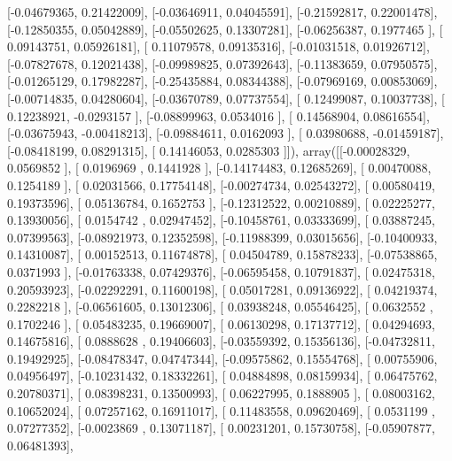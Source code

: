 \documentclass{article}
\begin{document}
       [-0.04679365,  0.21422009],
       [-0.03646911,  0.04045591],
       [-0.21592817,  0.22001478],
       [-0.12850355,  0.05042889],
       [-0.05502625,  0.13307281],
       [-0.06256387,  0.1977465 ],
       [ 0.09143751,  0.05926181],
       [ 0.11079578,  0.09135316],
       [-0.01031518,  0.01926712],
       [-0.07827678,  0.12021438],
       [-0.09989825,  0.07392643],
       [-0.11383659,  0.07950575],
       [-0.01265129,  0.17982287],
       [-0.25435884,  0.08344388],
       [-0.07969169,  0.00853069],
       [-0.00714835,  0.04280604],
       [-0.03670789,  0.07737554],
       [ 0.12499087,  0.10037738],
       [ 0.12238921, -0.0293157 ],
       [-0.08899963,  0.0534016 ],
       [ 0.14568904,  0.08616554],
       [-0.03675943, -0.00418213],
       [-0.09884611,  0.0162093 ],
       [ 0.03980688, -0.01459187],
       [-0.08418199,  0.08291315],
       [ 0.14146053,  0.0285303 ]]), array([[-0.00028329,  0.0569852 ],
       [ 0.0196969 ,  0.1441928 ],
       [-0.14174483,  0.12685269],
       [ 0.00470088,  0.1254189 ],
       [ 0.02031566,  0.17754148],
       [-0.00274734,  0.02543272],
       [ 0.00580419,  0.19373596],
       [ 0.05136784,  0.1652753 ],
       [-0.12312522,  0.00210889],
       [ 0.02225277,  0.13930056],
       [ 0.0154742 ,  0.02947452],
       [-0.10458761,  0.03333699],
       [ 0.03887245,  0.07399563],
       [-0.08921973,  0.12352598],
       [-0.11988399,  0.03015656],
       [-0.10400933,  0.14310087],
       [ 0.00152513,  0.11674878],
       [ 0.04504789,  0.15878233],
       [-0.07538865,  0.0371993 ],
       [-0.01763338,  0.07429376],
       [-0.06595458,  0.10791837],
       [ 0.02475318,  0.20593923],
       [-0.02292291,  0.11600198],
       [ 0.05017281,  0.09136922],
       [ 0.04219374,  0.2282218 ],
       [-0.06561605,  0.13012306],
       [ 0.03938248,  0.05546425],
       [ 0.0632552 ,  0.1702246 ],
       [ 0.05483235,  0.19669007],
       [ 0.06130298,  0.17137712],
       [ 0.04294693,  0.14675816],
       [ 0.0888628 ,  0.19406603],
       [-0.03559392,  0.15356136],
       [-0.04732811,  0.19492925],
       [-0.08478347,  0.04747344],
       [-0.09575862,  0.15554768],
       [ 0.00755906,  0.04956497],
       [-0.10231432,  0.18332261],
       [ 0.04884898,  0.08159934],
       [ 0.06475762,  0.20780371],
       [ 0.08398231,  0.13500993],
       [ 0.06227995,  0.1888905 ],
       [ 0.08003162,  0.10652024],
       [ 0.07257162,  0.16911017],
       [ 0.11483558,  0.09620469],
       [ 0.0531199 ,  0.07277352],
       [-0.0023869 ,  0.13071187],
       [ 0.00231201,  0.15730758],
       [-0.05907877,  0.06481393],
\end{document}
